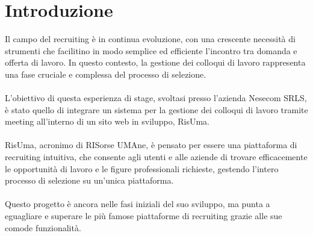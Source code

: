 \chapter*{Introduzione}  
 
Il campo del recruiting è in continua evoluzione, con una crescente necessità di strumenti 
che facilitino in modo semplice ed efficiente l'incontro tra domanda e offerta di lavoro. 
In questo contesto, la gestione dei colloqui di lavoro rappresenta una fase cruciale e
complessa del processo di selezione. 
\\
\\
L'obiettivo di questa esperienza di stage, svoltasi presso l'azienda Nesecom SRLS, 
è stato quello di integrare un sistema per la gestione dei colloqui di lavoro tramite meeting
all'interno di un sito web in sviluppo, RisUma.
\\ 
\\
RisUma, acronimo di RISorse UMAne, è pensato per essere una piattaforma di recruiting intuitiva, 
che consente agli utenti e alle aziende di trovare efficacemente le opportunità di lavoro e 
le figure professionali richieste, gestendo l'intero processo di selezione su un'unica piattaforma.
\\
\\
Questo progetto è ancora nelle fasi iniziali del suo sviluppo, ma punta a eguagliare 
e superare le più famose piattaforme di recruiting grazie alle sue comode funzionalità.